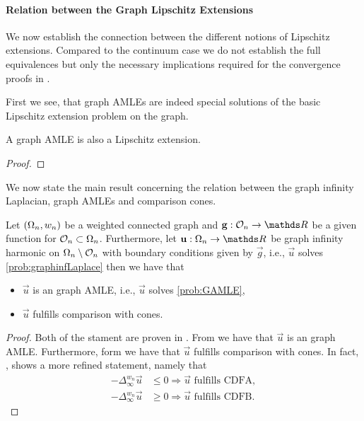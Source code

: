 \paragraph{Relation between the Graph Lipschitz Extensions}
We now establish the connection between the different notions of Lipschitz extensions. Compared to the continuum case we do not establish the full equivalences but only the necessary implications required for the convergence proofs in \cite{bungert2021uniform}.

First we see, that graph AMLEs are indeed special solutions of the basic Lipschitz extension problem on the graph.
%
\begin{lemma}{}{}
A graph AMLE is also a Lipschitz extension.
\end{lemma}
%
\begin{proof}

\end{proof}
%
%
We now state the main result concerning the relation between the graph infinity Laplacian, graph AMLEs and comparison cones.
%
%
\begin{lemma}{}{}
Let $(\Omega_n,w_n)$ be a weighted connected graph and $\vec g:\conset_n\to\R$ be a given function for $\mathcal{O}_n\subset\Omega_n$. Furthermore, let $\vec u:\domain_n\to\R$ be graph infinity harmonic on $\Omega_n\setminus\mathcal{O}_n$ with boundary conditions given by $\vec g$, i.e., $\vec u$ solves \cref{prob:graphinfLaplace} then we have that
%
\begin{itemize}
\item $\vec u$ is an graph AMLE, i.e., $\vec u$ solves \cref{prob:GAMLE},
\item $\vec u$ fulfills comparison with cones.
\end{itemize}
\end{lemma}
%
%
\begin{proof}
Both of the stament are proven in \cite{bungert2021uniform}. From \cite[Prop. 3.8]{bungert2021uniform} we have that $\vec u$ is an graph AMLE. Furthermore, form \cite[Th. 3.2]{bungert2021uniform} we have that $\vec u$ fulfills comparison with cones. In fact, \cite[Th. 3.2]{bungert2021uniform}, shows a more refined statement, namely that
%
\begin{align*}
-\Delta^{w_n}_\infty \vec u &\leq 0 \Rightarrow \vec u \text{ fulfills CDFA},\\
-\Delta^{w_n}_\infty \vec u &\geq 0 \Rightarrow \vec u \text{ fulfills CDFB}.
\end{align*}
%
\end{proof}
%
%
%
%
%
%
%
%
%
